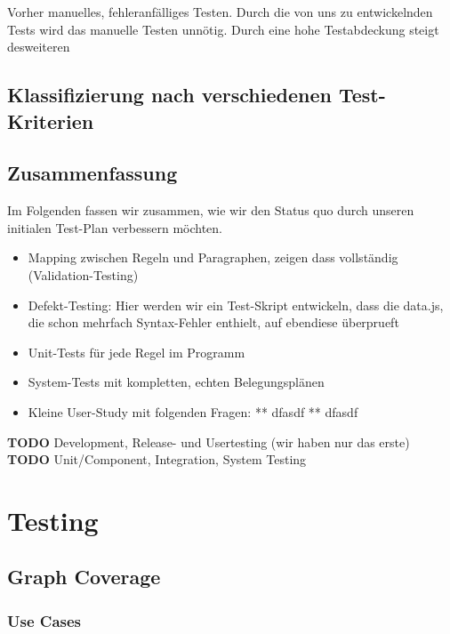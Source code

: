 \documentclass[ngerman]{article}
\begin{document}
Vorher manuelles, fehleranfälliges Testen. Durch die von uns zu
entwickelnden Tests wird das manuelle Testen unnötig. Durch eine hohe
Testabdeckung steigt desweiteren

\subsection{Klassifizierung nach verschiedenen Test-Kriterien}


\subsection{Zusammenfassung}
\label{sec:zusammenfassung}

Im Folgenden fassen wir zusammen, wie wir den Status quo durch unseren
initialen Test-Plan verbessern möchten.

\begin{itemize}
    \item Mapping zwischen Regeln und Paragraphen, zeigen dass vollständig (Validation-Testing)
    \item
        Defekt-Testing: Hier werden wir ein Test-Skript entwickeln, dass die data.js, die schon mehrfach Syntax-Fehler enthielt, auf ebendiese überprueft
    \item
        Unit-Tests für jede Regel im Programm
    \item
        System-Tests mit kompletten, echten Belegungsplänen
    \item
        Kleine User-Study mit folgenden Fragen: ** dfasdf ** dfasdf
\end{itemize}

\textbf{TODO} Development, Release- und Usertesting (wir haben nur das erste) \textbf{TODO} Unit/Component, Integration, System Testing

\section{Testing}

\subsection{Graph Coverage}
\subsubsection{Use Cases}
\end{document}
